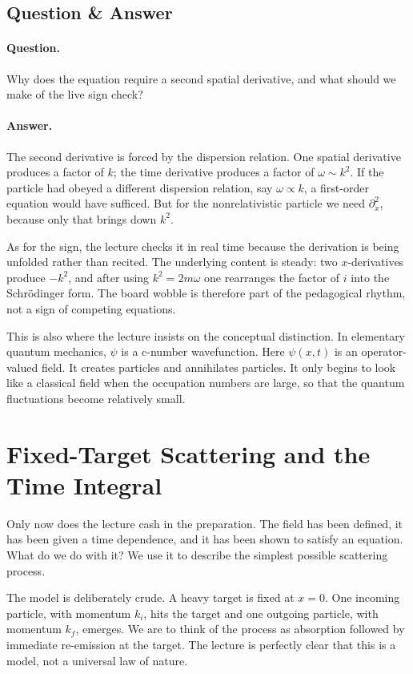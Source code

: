 \subsection{Question \& Answer}

\paragraph{Question.} Why does the equation require a second spatial derivative, and what should we make of the live sign check?

\paragraph{Answer.} The second derivative is forced by the dispersion relation. One spatial derivative produces a factor of \(k\); the time derivative produces a factor of \(\omega\sim k^2\). If the particle had obeyed a different dispersion relation, say \(\omega\propto k\), a first-order equation would have sufficed. But for the nonrelativistic particle we need \(\partial_x^2\), because only that brings down \(k^2\).

As for the sign, the lecture checks it in real time because the derivation is being unfolded rather than recited. The underlying content is steady: two \(x\)-derivatives produce \(-k^2\), and after using \(k^2=2m\omega\) one rearranges the factor of \(i\) into the Schr\"odinger form. The board wobble is therefore part of the pedagogical rhythm, not a sign of competing equations.

This is also where the lecture insists on the conceptual distinction. In elementary quantum mechanics, \(\psi\) is a c-number wavefunction. Here \(\psi(x,t)\) is an operator-valued field. It creates particles and annihilates particles. It only begins to look like a classical field when the occupation numbers are large, so that the quantum fluctuations become relatively small.

\section{Fixed-Target Scattering and the Time Integral}

Only now does the lecture cash in the preparation. The field has been defined, it has been given a time dependence, and it has been shown to satisfy an equation. What do we do with it? We use it to describe the simplest possible scattering process.

The model is deliberately crude. A heavy target is fixed at \(x=0\). One incoming particle, with momentum \(k_i\), hits the target and one outgoing particle, with momentum \(k_f\), emerges. We are to think of the process as absorption followed by immediate re-emission at the target. The lecture is perfectly clear that this is a model, not a universal law of nature.

